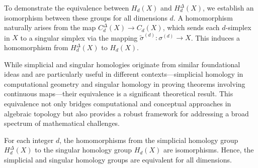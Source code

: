 To demonstrate the equivalence between $H_{d}(X)$ and $H^{\Delta}_{d}(X)$, we
establish an isomorphism between these groups for all dimensions $d$. A homomorphism
naturally arises from the map $C^{\Delta}_{d}(X) \rightarrow C_{d}(X)$, which
sends each $d$-simplex in $X$ to a singular simplex via the mapping
$\tilde{\sigma}^{(d)}: \sigma^{(d)}\rightarrow X$. This induces a homomorphism from
$H^{\Delta}_{d}(X)$ to $H_{d}(X)$.

While simplicial and singular homologies originate from similar foundational ideas
and are particularly useful in different contexts—simplicial homology in computational
geometry and singular homology in proving theorems involving continuous maps—their
equivalence is a significant theoretical result. This equivalence not only
bridges computational and conceptual approaches in algebraic topology but also
provides a robust framework for addressing a broad spectrum of mathematical
challenges.

\begin{theorem}{\cite[p.102f]{hatcher2005algebraic}}
	For each integer $d$, the homomorphisms from the simplicial homology group
	$H^{\Delta}_{d}(X)$ to the singular homology group $H_{d}(X)$ are isomorphisms.
	Hence, the simplicial and singular homology groups are equivalent for all
	dimensions.
\end{theorem}

